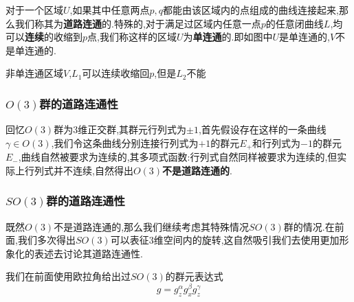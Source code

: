 对于一个区域$ U $,如果其中任意两点$p,q$都能由该区域内的点组成的曲线连接起来,那么我们称其为\textbf{道路连通}的.特殊的,对于满足过区域内任意一点$ p $的任意闭曲线$ L $,均可以\textbf{连续}的收缩到$ p $点,我们称这样的区域$ U $为\textbf{单连通}的.即如图中$ U $是单连通的,$ V $不是单连通的.
\begin{marginfigure}
    \centering
    \caption{非单连通区域$V$,$L_1$可以连续收缩回$ p $,但是$L_2$不能}
\end{marginfigure}
\subsubsection{$O(3)$群的道路连通性}
回忆$O(3)$群为3维正交群,其群元行列式为$\pm1$,首先假设存在这样的一条曲线$\gamma\in O(3)$,我们令这条曲线分别连接行列式为$+1$的群元$E_+$和行列式为$-1$的群元$E_-$,曲线自然被要求为连续的,其多项式函数:行列式自然同样被要求为连续的,但实际上行列式并不连续,自然得出$O(3)$\textbf{不是道路连通的}.

\subsubsection{$SO(3)$群的道路连通性}
既然$O(3)$不是道路连通的,那么我们继续考虑其特殊情况$SO(3)$群的情况.在前面,我们多次得出$SO(3)$可以表征$ 3 $维空间内的旋转,这自然吸引我们去使用更加形象化的表述去讨论其道路连通性.

我们在前面使用欧拉角给出过$SO(3)$的群元表达式
$$g=g_z^\alpha g_x^\beta g_z^\gamma$$

